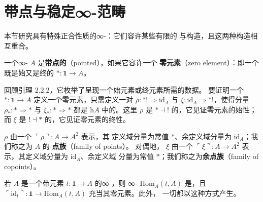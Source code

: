 \providecommand{\qcOne}{\mathbf{1}}   %
\providecommand{\qcor}[1]{\ulcorner#1\urcorner}   %
\providecommand{\colim}{\operatorname{colim}\nolimits}
\providecommand{\Asq}{A^{\square}}     %
\providecommand{\Alc}{A^{\llcorner}}   %
\providecommand{\Arc}{A^{\lrcorner}}   %

\section{带点与稳定∞-范畴}\label{sec:pointed-and-stable-infinity-categories}

本节研究具有特殊正合性质的∞-\trCategory{}：它们容许某些有限的\trLimit{}%
与\trColimit{}构造，且这两种构造相互重合。

\begin{definition}[\trPointed{}\trInfinityCategory]\label{def:pointed-infinity-category}
一个∞-\trCategory{} $A$ 是\textbf{带点的}（pointed），如果它容许一个%
\textbf{零元素}（zero element）：即一个既是始又是终的\trElement{}
$*\colon\qcOne\to A$。
\end{definition}

回顾引理 2.2.2，它枚举了呈现一个始元素或终元素所需的数据。
要证明一个\trElement{} $*\colon\qcOne\to A$ 定义一个零元素，只需定义一对%
\trNaturalTransformation{} $\rho\colon*!\Rightarrow\mathrm{id}_A$ 与
$\xi\colon\mathrm{id}_A\Rightarrow*!$，使得分量
$\rho_{*}\colon*\Rightarrow *$ 与 $\xi_{*}\colon*\Rightarrow *$ 都是
$\mathrm{h}A$ 中的\trIsomorphism{}。这里 $\rho$ 是\trAdjunction{} $*\dashv !$
的\trCounit{}，它见证零元素的始性；而 $\xi$ 是\trAdjunction{} $!\dashv *$
的\trUnit{}，它见证零元素的终性。

\trCounit{} $\rho$ 由一个\trFunctor{} $\qcor{\rho}\colon A\to A^{2}$ 表示，其%
定义域分量为常值 $*$、余定义域分量为 $\mathrm{id}_A$；我们称之为 $A$ 的%
\textbf{点族}（family of points）。
对偶地，\trUnit{} $\xi$ 由一个\trFunctor{}
$\qcor{\xi}\colon A\to A^{2}$ 表示，其定义域分量为 $\mathrm{id}_A$、余定义域
分量为常值 $*$；我们称之为\textbf{余点族}（family of copoints）。

\begin{lemma}\label{lem:pointed-based-elements}
若 $A$ 是一个带\trTerminal{}元素 $t\colon\qcOne\to A$ 的∞-\trCategory{}，则%
∞-\trCategory{} $\mathrm{Hom}_A(t,A)$ 是\trPointed{}，且
$\qcor{\mathrm{id}_t}\colon\qcOne\to\mathrm{Hom}_A(t,A)$ 充当其零元素。此外，
一切\trPointed{}\trInfinityCategory{}都以这种方式产生。
\end{lemma}

